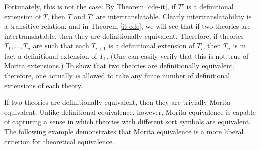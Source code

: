 Fortunately, this is not the case.  By Theorem \ref{cde-it}, if $T'$
is a definitional extension of $T$, then $T$ and $T'$ are
intertranslatable.  Clearly intertranslatability is a transitive
relation, and in Theorem \ref{it-cde}, we will see that if two
theories are intertranslatable, then they are definitionally
equivalent.  Therefore, if theories $T_1, \ldots, T_n$ are such that
each $T_{i+1}$ is a definitional extension of $T_i$, then $T_n$ is in
fact a definitional extension of $T_1$.  (One can easily verify that
this is not true of Morita extensions.)  To show that two theories are
definitionally equivalent, therefore, one actually \textit{is} allowed
to take any finite number of definitional extensions of each theory.



If two theories are definitionally equivalent, then they are trivially
Morita equivalent. Unlike definitional equivalence, however, Morita
equivalence is capable of capturing a sense in which theories with
different sort symbols are equivalent.  The following example
demonstrates that Morita equivalence is a more liberal criterion for
theoretical equivalence.

